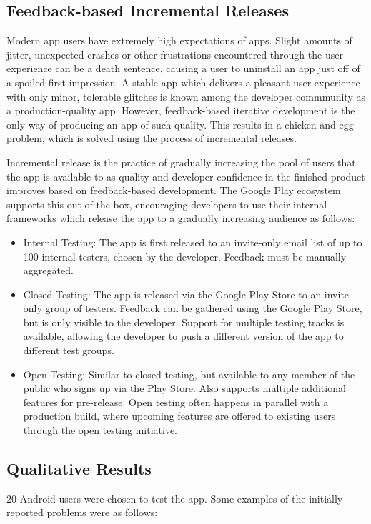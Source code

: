 \subsection{Feedback-based Incremental Releases}
Modern app users have extremely high expectations of apps. Slight amounts of jitter, unexpected crashes or other frustrations encountered through the user experience can be a death sentence, causing a user to uninstall an app just off of a spoiled first impression. A stable app which delivers a pleasant user experience with only minor, tolerable glitches is known among the developer commmunity as a production-quality app. However, feedback-based iterative development is the only way of producing an app of such quality. This results in a chicken-and-egg problem, which is solved using the process of incremental releases.

Incremental release is the practice of gradually increasing the pool of users that the app is available to as quality and developer confidence in the finished product improves based on feedback-based development. The Google Play ecosystem supports this out-of-the-box, encouraging developers to use their internal frameworks which release the app to a gradually increasing audience as follows:

\begin{itemize}
	\item Internal Testing: The app is first released to an invite-only email list of up to 100 internal testers, chosen by the developer. Feedback must be manually aggregated.
	\item Closed Testing: The app is released via the Google Play Store to an invite-only group of testers. Feedback can be gathered using the Google Play Store, but is only visible to the developer. Support for multiple testing tracks is available, allowing the developer to push a different version of the app to different test groups.
	\item Open Testing: Similar to closed testing, but available to any member of the public who signs up via the Play Store. Also supports multiple additional features for pre-release. Open testing often happens in parallel with a production build, where upcoming features are offered to existing users through the open testing initiative.
\end{itemize}

\subsection{Qualitative Results}
20 Android users were chosen to test the app. Some examples of the initially reported problems were as follows:

